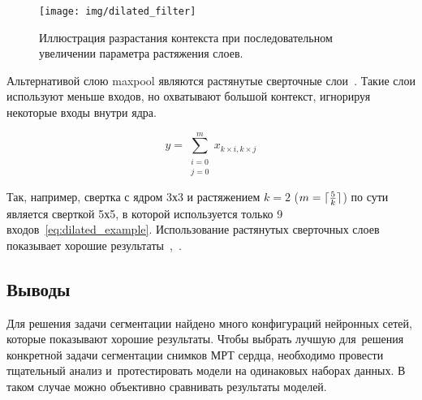 \begin{figure}[hb]
  \texttt{[image: img/dilated\_filter]}
  \caption{Иллюстрация разрастания контекста при последовательном увеличении параметра растяжения слоев.}
\end{figure}

Альтернативой слою maxpool являются растянутые сверточные слои~\cite{dilated_conv}. Такие слои используют меньше входов, но охватывают большой контекст, игнорируя некоторые входы внутри ядра. 

\begin{equation}
\label{eq:dilated_example}
y = \sum_{
  \substack{
    i=0 \\
    j=0
  }
}^{m}x_{k\times{}i,k\times{}j}
\end{equation}

\DeclarePairedDelimiter\ceil{\lceil}{\rceil}
\DeclarePairedDelimiter\floor{\lfloor}{\rfloor}

Так, например, свертка с ядром 3х3 и растяжением $k=2$ ($m=\ceil{\frac{5}{k}}$) по сути является сверткой 5х5, в которой используется только 9 входов~\eqref{eq:dilated_example}. Использование растянутых сверточных слоев показывает хорошие результаты~\cite{segm_dcnn_crf},~\cite{deeplab}.

\subsection{Выводы}

Для решения задачи сегментации найдено много конфигураций нейронных сетей, которые показывают хорошие результаты. Чтобы выбрать лучшую для~решения конкретной задачи сегментации снимков МРТ сердца, необходимо провести тщательный анализ и~протестировать модели на одинаковых наборах данных. В таком случае можно объективно сравнивать результаты моделей.
